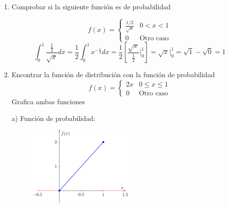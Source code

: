 \documentclass[a4paper, 12pt]{article}
\newcommand{\Pspace}{0.5cm}
\newcommand{\Aspace}{0.2cm}
\begin{document}
    \begin{enumerate}
        \item Comprobar si la siguiente función es de probabilidad \par
        \[
            f(x) =
            \begin{cases}
                \frac{1 / 2}{\sqrt{x}} & 0 < x < 1 \\
                0 & \text{Otro caso}
            \end{cases}
        \]
            \vspace{\Aspace}
            { \color{azul} 
                \[  \int_{0}^{1}\frac{\frac{1}{2}}{\sqrt{x}}dx 
                    = \frac{1}{2} \int_{0}^{1}x^{-\frac{1}{2}}dx
                    = \frac{1}{2} \left[ \frac{\sqrt{x}}{\frac{1}{2}} \Big|_{0}^{1} \right]
                    = \sqrt{x} \Big|_{0}^{1}
                    = \sqrt{1} - \sqrt{0} = 1
                \]
            }
        
        \newpage
        \vspace{\Pspace}
        \item Encontrar la función de distribución con la función de probabilidad
        \[
            f(x) =
            \begin{cases}
                2x & 0 \leq x \leq 1 \\
                0 & \text{Otro caso}
            \end{cases}
        \]       
        Grafica ambas funciones
            \vspace{\Aspace} \par
            { \color{azul} 
                a) Función de probabilidad: \par
                \begin{figure}[H]
                    \centering
                    \includegraphics[width=0.5\textwidth]{Assets/Pdf/T9P2IA.pdf}
                \end{figure}

}
\end{enumerate}
\end{document}
